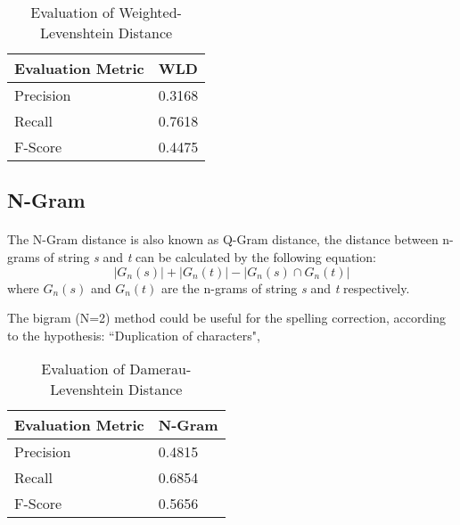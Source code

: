 \documentclass[11pt]{article}
\begin{document}
\begin{table}[h]
 \begin{center}
\begin{tabular}{| l | l |}

      \hline
      Evaluation Metric & WLD \\
      \hline\hline
      Precision & 0.3168 \\
      Recall & 0.7618 \\
      F-Score & 0.4475 \\
      \hline

\end{tabular}
\caption{Evaluation of Weighted-Levenshtein Distance}\label{table5}
 \end{center}
\end{table}

\subsection{N-Gram}

\paragraph{} The N-Gram distance is also known as Q-Gram distance, the distance between n-grams of string \textit{s} and \textit{t} can be calculated by the following equation:
$$
	|G_n(s)|+ |G_n(t)| - |G_n(s) \cap G_n(t)|
$$
where $G_n(s)$ and $G_n(t)$ are the n-grams of string \textit{s} and \textit{t} respectively.

The bigram (N=2) method could be useful for the spelling correction, according to the hypothesis: ``Duplication of characters", 

\begin{table}[h]
 \begin{center}
\begin{tabular}{| l | l |}

      \hline
      Evaluation Metric & N-Gram \\
      \hline\hline
      Precision & 0.4815 \\
      Recall & 0.6854 \\
      F-Score & 0.5656 \\
      \hline

\end{tabular}
\caption{Evaluation of Damerau-Levenshtein Distance}\label{table3}
 \end{center}
\end{table}
\end{document}
